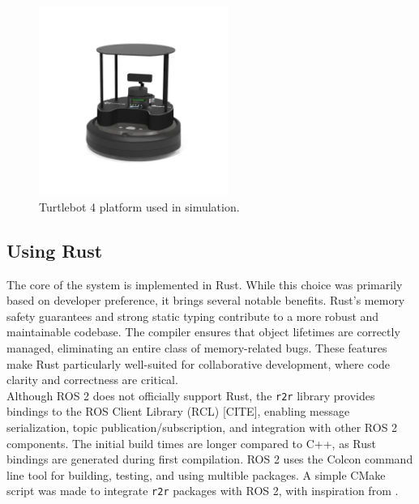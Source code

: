 \begin{figure}[H]
    \begin{center}
        \includegraphics[width=0.55\textwidth]{figures/tb4.png}
    \end{center}
    \caption{Turtlebot 4 platform used in simulation.}
    \label{fig:tb4}
\end{figure}

\subsection{Using Rust}
The core of the system is implemented in Rust. While this choice was primarily based on developer preference, it brings several notable benefits. 
Rust's memory safety guarantees and strong static typing contribute to a more robust and maintainable codebase. The compiler ensures that object lifetimes are correctly managed, eliminating an entire class of memory-related bugs. These features make Rust particularly well-suited for collaborative development, where code clarity and correctness are critical. \\

Although ROS 2 does not officially support Rust, the \texttt{r2r} library \cite{r2r} provides bindings to the ROS Client Library (RCL) {\color{red} [CITE]}, enabling message serialization, topic publication/subscription, and integration with other ROS 2 components. The initial build times are longer compared to C++, as Rust bindings are generated during first compilation. ROS 2 uses the Colcon command line tool \cite{colcon} for building, testing, and using multible packages. A simple CMake script was made to integrate \texttt{r2r} packages with ROS 2, with inspiration from \cite{r2r-minimal-node}. \\


